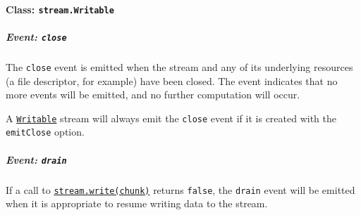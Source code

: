 \paragraph{\texorpdfstring{Class:
\texttt{stream.Writable}}{Class: stream.Writable}}\label{class-stream.writable}

\subparagraph{\texorpdfstring{Event:
\texttt{\textquotesingle{}close\textquotesingle{}}}{Event: \textquotesingle close\textquotesingle{}}}\label{event-close}

The \texttt{\textquotesingle{}close\textquotesingle{}} event is emitted
when the stream and any of its underlying resources (a file descriptor,
for example) have been closed. The event indicates that no more events
will be emitted, and no further computation will occur.

A \hyperref[class-streamwritable]{\texttt{Writable}} stream will always
emit the \texttt{\textquotesingle{}close\textquotesingle{}} event if it
is created with the \texttt{emitClose} option.

\subparagraph{\texorpdfstring{Event:
\texttt{\textquotesingle{}drain\textquotesingle{}}}{Event: \textquotesingle drain\textquotesingle{}}}\label{event-drain}

If a call to
\hyperref[writablewritechunk-encoding-callback]{\texttt{stream.write(chunk)}}
returns \texttt{false}, the
\texttt{\textquotesingle{}drain\textquotesingle{}} event will be emitted
when it is appropriate to resume writing data to the stream.

